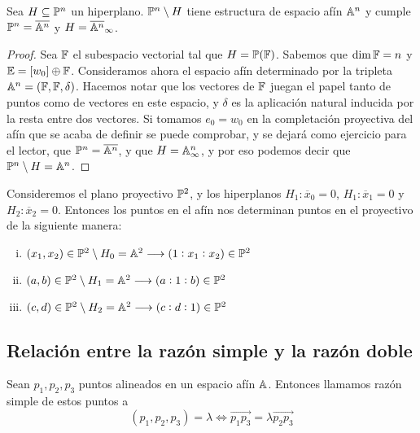  \begin{prop}
   Sea $H \subseteq \mathbb{P}^n$ un hiperplano. $\mathbb{P}^n \setminus H$ tiene estructura de
   espacio afín $\mathbb{A}^n$ y cumple $\mathbb{P}^n = \overline{\mathbb{A}^n}$ y $H = \overline{\mathbb{A}^n}_\infty$.
 \end{prop}

 \begin{proof}
  Sea $\mathbb{F}$ el subespacio vectorial tal que $H = \mathbb{P}(\mathbb{F})$. Sabemos que $\dim \mathbb{F} = n$ y
  $\mathbb{E} = [w_0] \oplus \mathbb{F}$. Consideramos ahora el espacio afín determinado por la tripleta
  $\mathbb{A}^n = (\mathbb{F}, \mathbb{F}, \delta)$. Hacemos notar que los vectores de $\mathbb{F}$ juegan el papel 
  tanto de puntos como de vectores
  en este espacio, y $\delta$ es la aplicación natural inducida por la resta entre dos
  vectores. Si tomamos $e_0 = w_0$ en la completación proyectiva
  del afín que se acaba de definir se puede comprobar, y se dejará como ejercicio para
  el lector, que $\mathbb{P}^n = \overline{\mathbb{A}^n}$, y que $H = \mathbb{A}^n_\infty$, y por eso podemos
  decir que $\mathbb{P}^n \setminus H = \mathbb{A}^n$.
 \end{proof}

\begin{example}
  Consideremos el plano proyectivo $\mathbb{P}^2$, y los hiperplanos $H_1\colon \overline{x}_0 = 0$,
  $H_1 \colon \overline{x}_1 = 0$ y $H_2 \colon \overline{x}_2 = 0$. Entonces los puntos
  en el afín nos determinan puntos en el proyectivo de la siguiente manera:
  \begin{enumerate}[i)]
    \item $(x_1, x_2) \in \mathbb{P}^2 \setminus H_0 = \mathbb{A}^2 \longrightarrow (1:x_1:x_2) \in \mathbb{P}^2$
    \item $(a, b) \in \mathbb{P}^2 \setminus H_1 = \mathbb{A}^2 \longrightarrow (a:1:b) \in \mathbb{P}^2$
    \item $(c, d) \in \mathbb{P}^2 \setminus H_2 = \mathbb{A}^2 \longrightarrow (c:d:1) \in \mathbb{P}^2$
  \end{enumerate}
\end{example}

\subsection{Relación entre la razón simple y la razón doble}

\begin{defi}
	Sean $p_1, p_2, p_3$ puntos alineados en un espacio afín $\mathbb{A}$. Entonces llamamos razón
	simple de estos puntos a
	\[
		(p_1, p_2, p_3) = \lambda \iff \overrightarrow{p_1p_3} = \lambda \overrightarrow{p_2p_3}
	\]
\end{defi}

